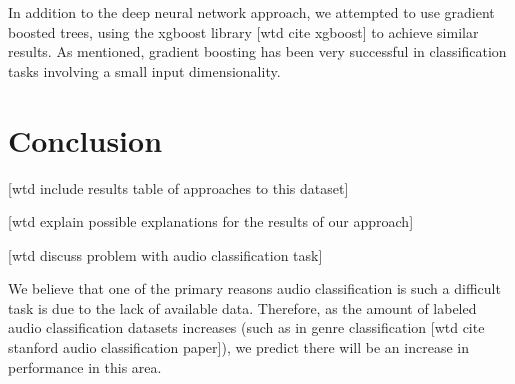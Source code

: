 In addition to the deep neural network approach, we attempted to use gradient boosted trees, using the xgboost library [wtd cite xgboost] to achieve similar results.  As mentioned, gradient boosting has been very successful in classification tasks involving a small input dimensionality.

\chapter{Conclusion}

[wtd include results table of approaches to this dataset]

[wtd explain possible explanations for the results of our approach]

[wtd discuss problem with audio classification task]

We believe that one of the primary reasons audio classification is such a difficult task is due to the lack of available data.  Therefore, as the amount of labeled audio classification datasets increases (such as in genre classification [wtd cite stanford audio classification paper]), we predict there will be an increase in performance in this area.

